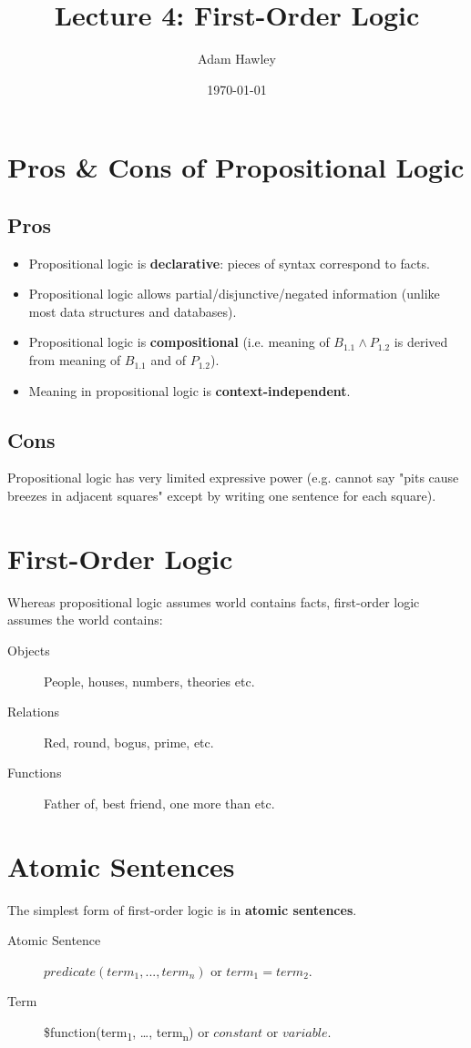 \documentclass[11pt]{article}
\author{Adam Hawley}
\date{\today}
\title{Lecture 4: First-Order Logic}
\begin{document}
\maketitle
\tableofcontents


\section{Pros \& Cons of Propositional Logic}
\label{sec:orgb833c97}
\subsection{Pros}
\label{sec:org49ce882}
\begin{itemize}
\item Propositional logic is \textbf{declarative}: pieces of syntax correspond to facts.
\item Propositional logic allows partial/disjunctive/negated information (unlike most data structures and databases).
\item Propositional logic is \textbf{compositional} (i.e. meaning of \(B_{1.1}\land P_{1.2}\) is derived from meaning of \(B_{1.1}\) and of \(P_{1.2}\)).
\item Meaning in propositional logic is \textbf{context-independent}.
\end{itemize}

\subsection{Cons}
\label{sec:org33bb263}
Propositional logic has very limited expressive power (e.g. cannot say "pits cause breezes in adjacent squares" except by writing one sentence for each square).

\section{First-Order Logic}
\label{sec:org5eef4ee}
Whereas propositional logic assumes world contains facts, first-order logic assumes the world contains:
\begin{description}
\item[{Objects}] People, houses, numbers, theories etc.
\item[{Relations}] Red, round, bogus, prime, etc.
\item[{Functions}] Father of, best friend, one more than etc.
\end{description}

\section{Atomic Sentences}
\label{sec:org39f2483}
The simplest form of first-order logic is in \textbf{atomic sentences}.
\begin{description}
\item[{Atomic Sentence}] \(predicate(term_1, ..., term_n)\) or \(term_1=term_2\).
\item[{Term}] \$function(term\textsubscript{1}, \ldots{}, term\textsubscript{n}) or \(constant\) or \(variable\).
\end{description}
\end{document}
